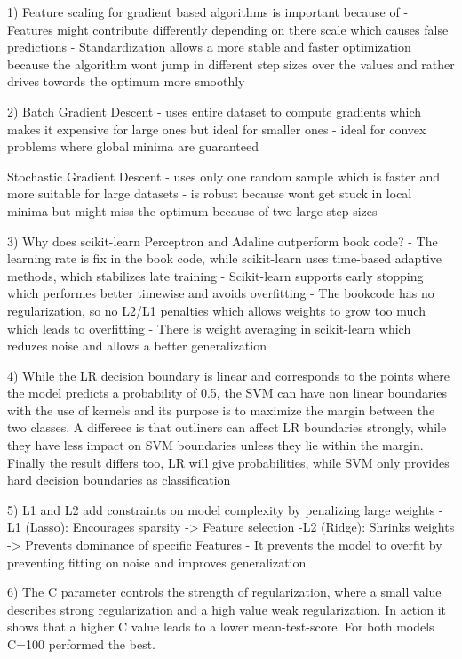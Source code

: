1) Feature scaling for gradient based algorithms is important because of
    - Features might contribute differently depending on there scale which 
    causes false predictions
    - Standardization allows a more stable and faster optimization because 
    the algorithm wont jump in different step sizes over the values and 
    rather drives towords the optimum more smoothly

2) Batch Gradient Descent 
    - uses entire dataset to compute gradients which makes it expensive for large ones but 
    ideal for smaller ones
    - ideal for convex problems where global minima are guaranteed

    Stochastic Gradient Descent
    - uses only one random sample which is faster and more 
    suitable for large datasets
    - is robust because wont get stuck in local minima but 
    might miss the optimum because of two large step sizes

3) Why does scikit-learn Perceptron and Adaline outperform book code?
    - The learning rate is fix in the book code, while scikit-learn 
    uses time-based adaptive methods, which stabilizes late training
    - Scikit-learn supports early stopping which performes better 
    timewise and avoids overfitting
    - The bookcode has no regularization, so no L2/L1 penalties which 
    allows weights to grow too much which leads to overfitting
    - There is weight averaging in scikit-learn which reduzes noise 
    and allows a better generalization
    
4) While the LR decision boundary is linear and corresponds to the points 
    where the model predicts a probability of 0.5, the SVM can have non
    linear boundaries with the use of kernels and its purpose is to 
    maximize the margin between the two classes. 
    A differece is that outliners can affect LR boundaries strongly, while 
    they have less impact on SVM boundaries unless they lie within the margin.
    Finally the result differs too, LR will give probabilities, while 
    SVM only provides hard decision boundaries as classification

5) L1 and L2 add constraints on model complexity by penalizing large weights
        -L1 (Lasso): Encourages sparsity -> Feature selection
        -L2 (Ridge): Shrinks weights -> Prevents dominance of 
            specific Features
    - It prevents the model to overfit by preventing fitting on noise 
    and improves generalization

6) The C parameter controls the strength of regularization, where 
    a small value describes strong regularization and a high value weak 
    regularization. 
    In action it shows that a higher C value leads to a lower mean-test-score.
    For both models C=100 performed the best.
